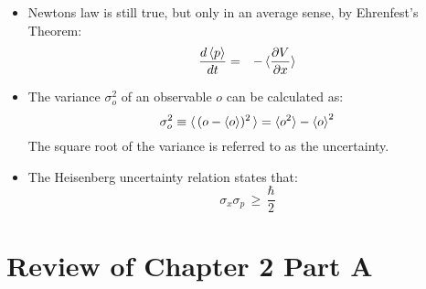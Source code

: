 \documentclass[12pt]{article}
\begin{document}
\begin{itemize}
\item Newtons law is still true, but only in an average sense, by Ehrenfest's Theorem:
\begin{eqnarray}
\frac{d \braket{p}}{dt} &=& - \braket{\frac{\partial V}{\partial x}}
\end{eqnarray}
\item The variance $\sigma^2_o$ of an observable $o$ can be calculated as:
\begin{equation}
\sigma_o^2 \equiv \braket{\,(o-\braket{o})^2\,} = \braket{o^2}-\braket{o}^2
\end{equation}
The square root of the variance is referred to as the uncertainty.  
\item The Heisenberg uncertainty relation states that:
\begin{equation}
\sigma_x \sigma_p \, \geq \, \frac{\hbar}{2}
\end{equation}

\end{itemize}

\section{Review of Chapter 2 Part A}
\end{document}
